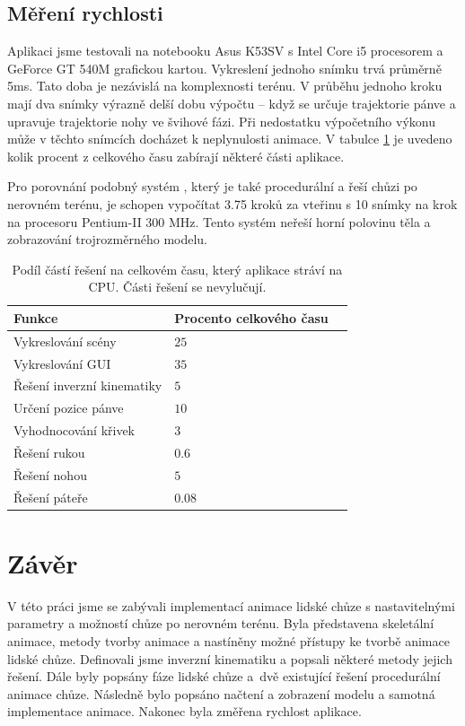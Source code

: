 \section{Měření rychlosti}
Aplikaci jsme testovali na notebooku Asus K53SV s Intel Core i5 procesorem a GeForce GT 540M grafic\-kou kartou. Vykreslení jednoho snímku trvá průměrně 5ms. Tato doba je nezávislá na komplexnosti terénu. V průběhu jednoho kroku mají dva snímky výrazně delší dobu výpočtu -- když se určuje trajektorie pánve a upravuje trajektorie nohy ve švihové fázi. Při nedostatku výpočetního výkonu může v těchto snímcích docházet k neplynulosti animace. V tabulce \ref{tab:measure_table} je uvedeno kolik procent z celkového času zabírají některé části aplikace.

Pro porovnání podobný systém \cite{chung}, který je také procedurální a řeší chůzi po nerovném terénu, je scho\-pen vypočítat 3.75 kroků za vteřinu s 10 snímky na krok na procesoru Pentium-II 300 MHz. Tento systém neřeší horní polovinu těla a zobrazování trojrozměrné\-ho mo\-delu.

\begin{table}[h]
	\vskip6pt
	\caption{Podíl částí řešení na celkovém času, který aplikace stráví na CPU. Části řešení se nevylučují.}
	\centering
	\begin{tabular}{llr}
		\toprule
		Funkce & Procento celkového času \\
		\midrule
		Vykreslování scény & $25$ \\
		Vykreslování GUI & $35$ \\
		Řešení inverzní kinematiky & $5$ \\
		Určení pozice pánve & $10$ \\
		Vyhodnocování křivek & $3$ \\
		Řešení rukou & $0.6$ \\
		Řešení nohou & $5$ \\
		Řešení páteře & $0.08$ \\
		\bottomrule
	\end{tabular}
	\label{tab:measure_table}
\end{table}

\chapter{Závěr}
V této práci jsme se zabývali implementací animace lidské chůze s nastavitelnými parametry a možností chůze po nerovném terénu. Byla představena skeletální animace, metody tvorby animace a nastíněny možné přístupy ke tvorbě animace lidské chůze. Definovali jsme inverzní kinematiku a popsali některé metody jejich řešení. Dále byly popsány fáze lidské chůze a~dvě existující řešení procedurální animace chůze. Následně bylo popsáno načtení a zobrazení modelu a samotná implementace animace. Nakonec byla změřena rychlost aplikace.

